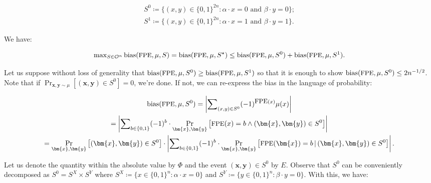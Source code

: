 \[\begin{gathered}
\displaystyle S^{0} \displaystyle\coloneqq\{(x,y)\in\{0,1\}^{2n}:\alpha\cdot x=0\text{ and }\beta\cdot y=0\}; \\
\displaystyle S^{1} \displaystyle\coloneqq\{(x,y)\in\{0,1\}^{2n}:\alpha\cdot x=1\text{ and }\beta\cdot y=1\}.
\end{gathered}\]


We have:\par


\[\begin{gathered}
\max\nolimits_{S\in\mathcal{O}^{n}}{\textup{bias}}({\textrm{\small{FPE}}},\mu,S)={\textup{bias}}({\textrm{\small{FPE}}},\mu,S^{\star})\leq{\textup{bias}}({\textrm{\small{FPE}}},\mu,S^{0})+{\textup{bias}}({\textrm{\small{FPE}}},\mu,S^{1}).
\end{gathered}\]


Let us suppose without loss of generality that ${\textup{bias}}({\textrm{\small{FPE}}},\mu,S^{0})\geq{\textup{bias}}({\textrm{\small{FPE}}},\mu,S^{1})$ so that it is enough to show ${\textup{bias}}({\textrm{\small{FPE}}},\mu,S^{0})\leq 2n^{-1/2}$. Note that if $\Pr_{\bm{x},\bm{y}\sim\mu}[(\bm{x},\bm{y})\in S^{0}]=0$, we’re done. If not, we can re-express the bias in the language of probability:\par


\[\begin{gathered}
\displaystyle{\textup{bias}}({\textrm{\small{FPE}}},\mu,S^{0}) \displaystyle=\left|\sum\nolimits_{(x,y)\in S^{0}}(-1)^{{\textrm{\small{FPE}}}(x)}\mu(x)\right| \\
\displaystyle=\left|\sum\nolimits_{b\in\{0,1\}}(-1)^{b}\cdot\Pr_{\bm{x},\bm{y}}\left[{\textrm{\small{FPE}}}(x)=b\wedge(\bm{x},\bm{y})\in S^{0}\right]\right| \\
\displaystyle=\Pr_{\bm{x},\bm{y}}\left[(\bm{x},\bm{y})\in S^{0}\right]\cdot\left|\sum\nolimits_{b\in\{0,1\}}(-1)^{b}\cdot\Pr_{\bm{x},\bm{y}}\left[{\textrm{\small{FPE}}}(\bm{x})=b\,|\,(\bm{x},\bm{y})\in S^{0}\right]\right|.
\end{gathered}\]


Let us denote the quantity within the absolute value by $\Phi$ and the event $(\bm{x},\bm{y})\in S^{0}$ by $E$. Observe that $S^{0}$ can be conveniently decomposed as $S^{0}=S^{X}\times S^{Y}$ where $S^{X}\coloneqq\{x\in\{0,1\}^{n}:\alpha\cdot x=0\}$ and $S^{Y}\coloneqq\{y\in\{0,1\}^{n}:\beta\cdot y=0\}$. With this, we have:\par


